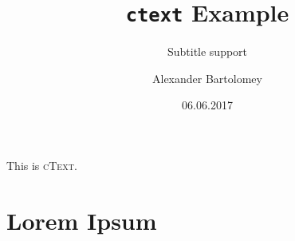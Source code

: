 \documentclass{ctext}
\title{\texttt{ctext} Example}
\subtitle{Subtitle support}
\author{Alexander Bartolomey}
\date{06.06.2017}
\begin{document}
\maketitle
This is \textsc{cText}.
\section{Lorem Ipsum}
\lipsum[1-14]
\end{document}
